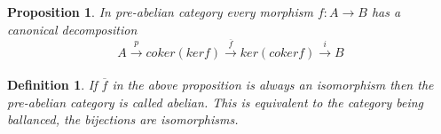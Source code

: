 \documentclass{article}
\theoremstyle{problemstyle}
\theoremstyle{problemstyle}
\newtheorem{definition}{Definition}
\theoremstyle{problemstyle}
\theoremstyle{problemstyle}
\theoremstyle{problemstyle}
\newtheorem{proposition}{Proposition}
\theoremstyle{problemstyle}
\begin{document}
\begin{proposition}
In pre-abelian category every morphism $f:A \rightarrow B$ has a canonical decomposition $$A\xrightarrow[]{p}coker(kerf) \xrightarrow[]{\overline{f}} ker(coker f) \xrightarrow[]{i} B$$ 
\end{proposition}

\begin{definition}
If $\overline{f}$ in the above proposition is always an isomorphism then the pre-abelian category is called abelian. This is equivalent to the category being ballanced, the bijections are isomorphisms.
\end{definition}



% 
% 
% 
% 
% 
\end{document}
